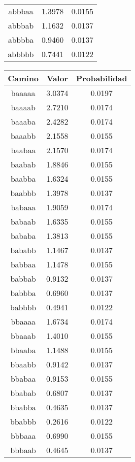 \begin{figure}[hbpt]
\begin{minipage}{0.48\textwidth}
\begin{center}
\begin{tabular}{|c|c|c|}
abbbaa  &  1.3978  &  0.0155  \\
abbbab  &  1.1632  &  0.0137  \\
abbbba  &  0.9460  &  0.0137  \\
abbbbb  &  0.7441  &  0.0122  \\
\hline
\end{tabular}
\end{center}
\end{minipage}
\begin{minipage}{0.48\textwidth}
\begin{center}
\begin{tabular}{|c|c|c|}
\hline
\textbf{Camino} & \textbf{Valor} & \textbf{Probabilidad} \\
\hline
baaaaa  &  3.0374  &  0.0197  \\
baaaab  &  2.7210  &  0.0174  \\
baaaba  &  2.4282  &  0.0174  \\
baaabb  &  2.1558  &  0.0155  \\
baabaa  &  2.1570  &  0.0174  \\
baabab  &  1.8846  &  0.0155  \\
baabba  &  1.6324  &  0.0155  \\
baabbb  &  1.3978  &  0.0137  \\
babaaa  &  1.9059  &  0.0174  \\
babaab  &  1.6335  &  0.0155  \\
bababa  &  1.3813  &  0.0155  \\
bababb  &  1.1467  &  0.0137  \\
babbaa  &  1.1478  &  0.0155  \\
babbab  &  0.9132  &  0.0137  \\
babbba  &  0.6960  &  0.0137  \\
babbbb  &  0.4941  &  0.0122  \\
bbaaaa  &  1.6734  &  0.0174  \\
bbaaab  &  1.4010  &  0.0155  \\
bbaaba  &  1.1488  &  0.0155  \\
bbaabb  &  0.9142  &  0.0137  \\
bbabaa  &  0.9153  &  0.0155  \\
bbabab  &  0.6807  &  0.0137  \\
bbabba  &  0.4635  &  0.0137  \\
bbabbb  &  0.2616  &  0.0122  \\
bbbaaa  &  0.6990  &  0.0155  \\
bbbaab  &  0.4645  &  0.0137  \\

\end{tabular}
\end{center}
\end{minipage}
\end{figure}
